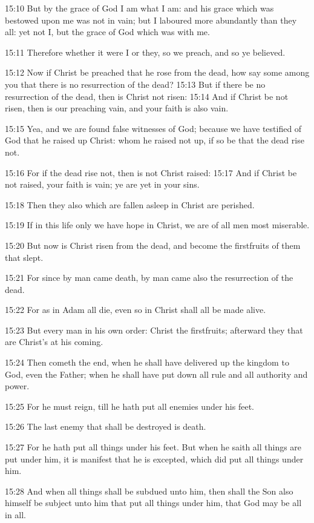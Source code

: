 15:10 But by the grace of God I am what I am: and his grace which was
bestowed upon me was not in vain; but I laboured more abundantly than
they all: yet not I, but the grace of God which was with me.

15:11 Therefore whether it were I or they, so we preach, and so ye
believed.

15:12 Now if Christ be preached that he rose from the dead, how say
some among you that there is no resurrection of the dead?  15:13 But
if there be no resurrection of the dead, then is Christ not risen:
15:14 And if Christ be not risen, then is our preaching vain, and your
faith is also vain.

15:15 Yea, and we are found false witnesses of God; because we have
testified of God that he raised up Christ: whom he raised not up, if
so be that the dead rise not.

15:16 For if the dead rise not, then is not Christ raised: 15:17 And
if Christ be not raised, your faith is vain; ye are yet in your sins.

15:18 Then they also which are fallen asleep in Christ are perished.

15:19 If in this life only we have hope in Christ, we are of all men
most miserable.

15:20 But now is Christ risen from the dead, and become the
firstfruits of them that slept.

15:21 For since by man came death, by man came also the resurrection
of the dead.

15:22 For as in Adam all die, even so in Christ shall all be made
alive.

15:23 But every man in his own order: Christ the firstfruits;
afterward they that are Christ's at his coming.

15:24 Then cometh the end, when he shall have delivered up the kingdom
to God, even the Father; when he shall have put down all rule and all
authority and power.

15:25 For he must reign, till he hath put all enemies under his feet.

15:26 The last enemy that shall be destroyed is death.

15:27 For he hath put all things under his feet. But when he saith all
things are put under him, it is manifest that he is excepted, which
did put all things under him.

15:28 And when all things shall be subdued unto him, then shall the
Son also himself be subject unto him that put all things under him,
that God may be all in all.

